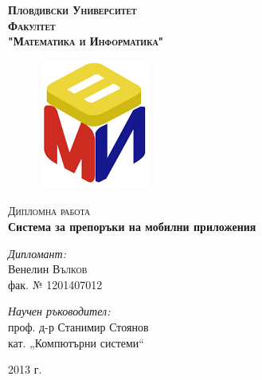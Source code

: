 
\begin{titlepage}

\begin{center}

\textsc{\huge \bfseries Пловдивски Университет}\\[1.0cm]
\textsc{\LARGE \bfseries Факултет \\"Математика и Информатика"}\\[1.5cm]

\begin{figure}[htb]
	\centering
	\includegraphics[scale=0.8]{assets/fmi-logo.png}
\end{figure}

\textsc{\Large Дипломна работа}\\[1.5cm]

{ \huge \bfseries Система за препоръки на мобилни приложения}\\[2.0cm]

\begin{minipage}{0.4\textwidth}
\begin{flushleft} \large
\emph{Дипломант:}\\
Венелин \textsc{Вълков} \\
\small
фак. № 1201407012
\end{flushleft}
\end{minipage}
\begin{minipage}{0.5\textwidth}
\begin{flushright} \large
\emph{Научен ръководител:} \\
проф. д-р Станимир Стоянов \\
\small
кат. \nolinebreak[4] „Компютърни \nolinebreak[4] системи“ 
\end{flushright}
\end{minipage}

\vfill

{\large 2013 г.}

\end{center}

\end{titlepage}